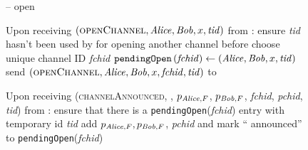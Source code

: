 
\begin{figure}[H]
  \begin{systembox}{\fpaynet{} -- open}
    \begin{algorithmic}[1]
      \State Upon receiving $\left(\textsc{openChannel}, \mathit{Alice}, \mathit{Bob}, x,
      \mathit{tid}\right)$ from \alice:
      \Indent
        \State ensure \textit{tid} hasn't been used by \alice{} for opening
        another channel before
        \label{alg:fpaynet:open:valid}
        \State choose unique channel ID \textit{fchid}
        \State $\mathtt{pendingOpen}\left(\mathit{fchid}\right) \gets
        \left(\mathit{Alice}, \mathit{Bob}, x, \mathit{tid}\right)$
        \State send $\left(\textsc{openChannel}, \mathit{Alice}, \mathit{Bob}, x,
        \mathit{fchid}, \mathit{tid}\right)$ to \simulator
      \EndIndent
      \Statex

      \State Upon receiving (\textsc{channelAnnounced}, \alice, $p_{\mathit{Alice},
      F}$, $p_{\mathit{Bob}, F}$, \textit{fchid}, \textit{pchid}, \textit{tid}) from
      \simulator:
      \Indent
        \State ensure that there is a \texttt{pendingOpen}(\textit{fchid})
        entry with temporary id \textit{tid}
        \label{alg:fpaynet:announced:valid}
        \State add $p_{\mathit{Alice}, F}, p_{\mathit{Bob}, F}$, \textit{pchid} and  mark
        ``\alice{} announced'' to \texttt{pendingOpen}(\textit{fchid})
        \label{alg:fpaynet:announced:add}
      \EndIndent
      \Statex


\end{algorithmic}
\end{systembox}
\end{figure}
